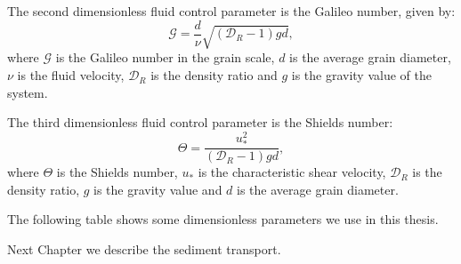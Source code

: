     The second dimensionless fluid control parameter is the Galileo number, given by:
\begin{equation}
    \label{equ:Reynolds}
    \mathcal{G} = \frac{d}{\nu}\sqrt{\left(\mathcal{D}_{R}-1\right)gd},
\end{equation}
where $\mathcal{G}$ is the Galileo number in the grain scale, $d$ is the average grain diameter, $\nu$ is the fluid velocity, $\mathcal{D}_{R}$ is the density ratio and $g$ is the gravity value of the system.

    The third dimensionless fluid control parameter is the Shields number:
\begin{equation}
    \label{equ:Shields}
    \Theta = \frac{u_{*}^{2}}{\left(\mathcal{D}_{R}-1\right)gd},
\end{equation}
where $\Theta$ is the Shields number, $u_{*}$ is the characteristic shear velocity, $\mathcal{D}_{R}$ is the density ratio, $g$ is the gravity value and $d$ is the average grain diameter.

    The following table shows some dimensionless parameters we use in this thesis.



    Next Chapter we describe the sediment transport.
